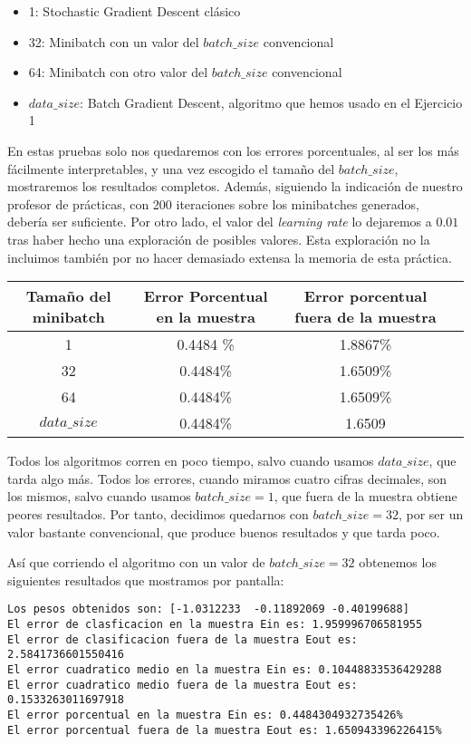 \documentclass[11pt]{article}
\begin{document}
\begin{itemize}
    \item 1: Stochastic Gradient Descent clásico
    \item 32: Minibatch con un valor del $batch\_size$ convencional
    \item 64: Minibatch con otro valor del $batch\_size$ convencional
    \item $data\_size$: Batch Gradient Descent, algoritmo que hemos usado en el Ejercicio 1
\end{itemize}

En estas pruebas solo nos quedaremos con los errores porcentuales, al ser los más fácilmente interpretables, y una vez escogido el tamaño del $batch\_size$, mostraremos los resultados completos. Además, siguiendo la indicación de nuestro profesor de prácticas, con 200 iteraciones sobre los minibatches generados, debería ser suficiente. Por otro lado, el valor del \emph{learning rate} lo dejaremos a $0.01$ tras haber hecho una exploración de posibles valores. Esta exploración no la incluimos también por no hacer demasiado extensa la memoria de esta práctica.

\begin{center}
    \begin{tabular}{| c | c | c | c |}
        Tamaño del minibatch & Error Porcentual en la muestra & Error porcentual fuera de la muestra \\
        \hline
        1 & 0.4484 \% & 1.8867\% \\
        32 & 0.4484\% & 1.6509\% \\
        64 & 0.4484\% & 1.6509\% \\
        $data\_size$ & 0.4484\% & 1.6509 \\
        \hline
    \end{tabular}
\end{center}

Todos los algoritmos corren en poco tiempo, salvo cuando usamos $data\_size$, que tarda algo más. Todos los errores, cuando miramos cuatro cifras decimales, son los mismos, salvo cuando usamos $batch\_size = 1$, que fuera de la muestra obtiene peores resultados. Por tanto, decidimos quedarnos con $batch\_size = 32$, por ser un valor bastante convencional, que produce buenos resultados y que tarda poco.

Así que corriendo el algoritmo con un valor de $batch\_size = 32$ obtenemos los siguientes resultados que mostramos por pantalla:

\begin{lstlisting}
Los pesos obtenidos son: [-1.0312233  -0.11892069 -0.40199688]
El error de clasficacion en la muestra Ein es: 1.959996706581955
El error de clasificacion fuera de la muestra Eout es: 2.5841736601550416
El error cuadratico medio en la muestra Ein es: 0.10448833536429288
El error cuadratico medio fuera de la muestra Eout es: 0.1533263011697918
El error porcentual en la muestra Ein es: 0.4484304932735426%
El error porcentual fuera de la muestra Eout es: 1.650943396226415%
\end{lstlisting}
\end{document}
